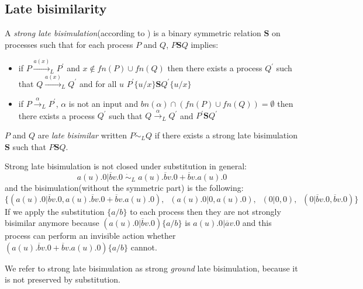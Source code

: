 \subsection{Late bisimilarity}

\begin{definition}
  A \emph{strong late bisimulation}(according to \cite{parrow}) is a binary symmetric relation $\mathbf{S}$ on processes such that for each process $P$ and $Q$, $P\mathbf{S}Q$ implies:
  \begin{itemize}
    \item
      if $P \xrightarrow{a(x)}_{L} P^{'}$ and $x\notin fn(P)\cup fn(Q)$ then there exists a process $Q^{'}$ such that $Q \xrightarrow{a(x)}_{L} Q^{'}$ and for all $u$ $P^{'}\{u/x\}\mathbf{S}Q^{'}\{u/x\}$
    \item 
      if $P \xrightarrow{\alpha}_{L} P^{'}$, $\alpha$ is not an input and $bn(\alpha) \cap (fn(P)\cup fn(Q)) = \emptyset$ then there exists a process $Q^{'}$ such that $Q \xrightarrow{\alpha}_{L} Q^{'}$ and $P^{'}\mathbf{S}Q^{'}$
  \end{itemize}
  $P$ and $Q$ are \emph{late bisimilar} written $P\dot{\sim}_{L}Q$ if there exists a strong late bisimulation $\mathbf{S}$ such that $P\mathbf{S}Q$.
\end{definition}

\begin{example}
  Strong late bisimulation is not closed under substitution in general:
  \[
    a(u).0|\overline{b}v.0\; \dot{\sim}_{L}\; a(u).\overline{b}v.0 + \overline{b}v.a(u).0
  \]
  and the bisimulation(without the symmetric part) is  the following:
  \[
    \{(a(u).0|\overline{b}v.0, a(u).\overline{b}v.0 + \overline{b}v.a(u).0),\;\; (a(u).0|0,a(u).0),\;\; (0|0,0),\;\; (0|\overline{b}v.0,\overline{b}v.0)\} 
  \]
  If we apply the substitution $\{a/b\}$ to each process then they are not strongly bisimilar anymore because $(a(u).0|\overline{b}v.0)\{a/b\}$ is $a(u).0|\overline{a}v.0$ and this process can perform an invisible action whether $(a(u).\overline{b}v.0 + \overline{b}v.a(u).0)\{a/b\}$ cannot.
\end{example}

We refer to strong late bisimulation as strong \emph{ground} late bisimulation, because it is not preserved by substitution.

